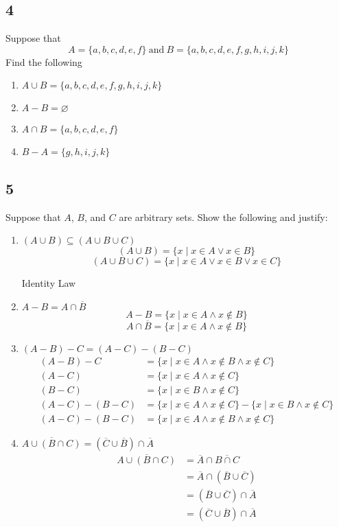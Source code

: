 \documentclass[letterpaper, 12pt]{math}
\begin{document}
\subsection*{4}
Suppose that
\[ A = \{a,b,c,d,e,f\}\ \mathrm{and}\ B = \{a,b,c,d,e,f,g,h,i,j,k\} \]
Find the following
\begin{enumerate}
  \item \( A\cup B = \{a,b,c,d,e,f,g,h,i,j,k\} \)
  \item \( A-B = \varnothing \)
  \item \( A\cap B = \{a,b,c,d,e,f\} \)
  \item \( B-A = \{g,h,i,j,k\} \)
\end{enumerate}

\subsection*{5}
Suppose that \( A \), \( B \), and \( C \) are arbitrary sets. Show the
following and justify:
\begin{enumerate}
  \item \( (A\cup B) \subseteq (A\cup B\cup C) \)
  \[ (A\cup B) = \{x\mid x \in A \vee x \in B \} \]
  \[ (A\cup B\cup C) = \{x\mid x \in A \vee x \in B \vee x \in C\} \]
  \begin{center}
    Identity Law
  \end{center}
  \item \( A-B = A\cap \overline{B} \)
  \[ A-B = \{x\mid x \in A \wedge x \notin B\} \]
  \[ A\cap \overline{B} = \{x\mid x \in A \wedge x \notin B\} \]
  \item \( (A-B)-C = (A-C)-(B-C) \)
  \begin{align*}
    (A-B)-C &= \{x\mid x \in A \wedge x \notin B \wedge x \notin C\} \\
    (A-C) &= \{x\mid x \in A \wedge x \notin C\} \\
    (B-C) &= \{x\mid x \in B \wedge x \notin C\} \\
    (A-C)-(B-C) &= \{x\mid x \in A \wedge x \notin C\}-
     \{x\mid x \in B \wedge x \notin C\} \\
    (A-C)-(B-C) &= \{x\mid x \in A \wedge x \notin B \wedge x \notin C\}
  \end{align*}
  \item \( \overline{A \cup (B \cap C)} = (\overline{C} \cup \overline{B}) \cap
     \overline{A} \)
  \begin{align*}
    \overline{A \cup (B \cap C)} &=
      \overline{A} \cap \overline{B \cap C} \\
    &= \overline{A} \cap (\overline{B} \cup \overline{C}) \\
    &= (\overline{B} \cup \overline{C}) \cap \overline{A} \\
    &= (\overline{C} \cup \overline{B}) \cap \overline{A}
  \end{align*}
\end{enumerate}
\end{document}
